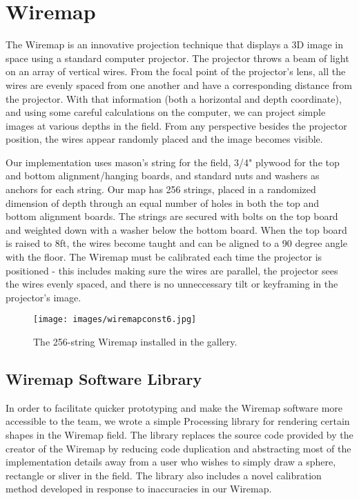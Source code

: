 \section{Wiremap}
The Wiremap is an innovative projection technique that displays a 3D image in space using a standard computer projector. The projector throws a beam of light on an array of vertical wires. From the focal point of the projector’s lens, all the wires are evenly spaced from one another and have a corresponding distance from the projector. With that information (both a horizontal and depth coordinate), and using some careful calculations on the computer, we can project simple images at various depths in the field. From any perspective besides the projector position, the wires appear randomly placed and the image becomes visible.

Our implementation uses mason's string for the field, 3/4" plywood for the top and bottom alignment/hanging boards, and standard nuts and washers as anchors for each string. Our map has 256 strings, placed in a randomized dimension of depth through an equal number of holes in both the top and bottom alignment boards. The strings are secured with bolts on the top board and weighted down with a washer below the bottom board. When the top board is raised to 8ft, the wires become taught and can be aligned to a 90 degree angle with the floor. The Wiremap must be calibrated each time the projector is positioned - this includes making sure the wires are parallel, the projector sees the wires evenly spaced, and there is no unneccessary tilt or keyframing in the projector's image.

\begin{figure}[htp]\centering
  \texttt{[image: images/wiremapconst6.jpg]}
  \caption{The 256-string Wiremap installed in the gallery.}\label{fig:wmdiagram}
\end{figure}
\subsection{Wiremap Software Library}
In order to facilitate quicker prototyping and make the Wiremap software more accessible to the team, we wrote a simple Processing library for rendering certain shapes in the Wiremap field. The library replaces the source code provided by the creator of the Wiremap \cite{AH} by reducing code duplication and abstracting most of the implementation details away from a user who wishes to simply draw a sphere, rectangle or sliver in the field. The library also includes a novel calibration method developed in response to inaccuracies in our Wiremap.

